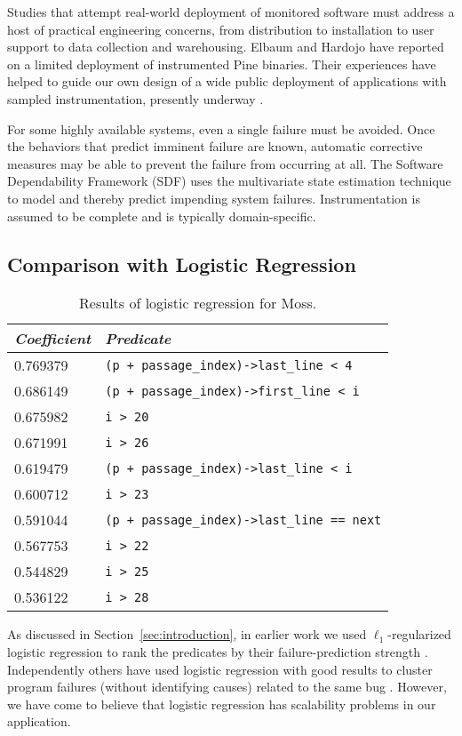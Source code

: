 \documentclass[draft]{sig-alternate}
\begin{document}
Studies that attempt real-world deployment of monitored software must
address a host of practical engineering concerns, from distribution to
installation to user support to data collection and warehousing.
Elbaum and Hardojo \cite{Elbaum:2003:DISATA} have reported on a
limited deployment of instrumented Pine binaries.  Their experiences
have helped to guide our own design of a wide public deployment of
applications with sampled instrumentation, presently underway
\cite{Liblit:2003:CBIP}.

For some highly available systems, even a single failure must be
avoided.  Once the behaviors that predict imminent failure are known,
automatic corrective measures may be able to prevent the failure from
occurring at all.  The Software Dependability Framework (SDF)
\cite{Gross:2003:PSMUST} uses the multivariate state estimation
technique to model and thereby predict impending system failures.
Instrumentation is assumed to be complete and is typically
domain-specific.


\subsection{Comparison with Logistic Regression}
\label{sec:comparison}

\begin{table}
\centering
\begin{tabular}{l|l}
{\em Coefficient} & {\em Predicate} \\ \hline
0.769379 & {\tt (p + passage\_index)->last\_line < 4}  \\
0.686149 & {\tt (p + passage\_index)->first\_line < i} \\
0.675982 & {\tt i > 20} \\
0.671991 & {\tt i > 26} \\
0.619479 & {\tt (p + passage\_index)->last\_line < i}  \\
0.600712 & {\tt i > 23} \\
0.591044 & {\tt (p + passage\_index)->last\_line == next} \\
0.567753 & {\tt i > 22} \\
0.544829 & {\tt i > 25} \\
0.536122 & {\tt i > 28} 
\end{tabular}
\caption{Results of logistic regression for Moss.}
\label{tab:logregression}
\end{table}




As discussed in Section~\ref{sec:introduction}, in earlier work 
we used $\ell_1$-regularized logistic regression
to rank the predicates by their
failure-prediction strength \cite{PLDI`03*141,Zheng:2003:SDSP}.  Independently others have used
logistic regression with good results to cluster program failures (without
identifying causes) related to the same bug \cite{ICSE`03*465}.  However, we have come
to believe that logistic regression has scalability problems in our application.
\end{document}
